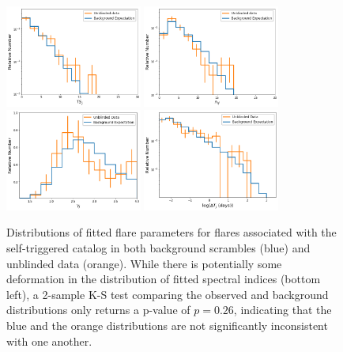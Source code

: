 \begin{figure}[h]
\centering
\includegraphics[width=0.4\textwidth]{figs/st_tsjdist.png}
\includegraphics[width=0.4\textwidth]{figs/st_nsdist.png}
\includegraphics[width=0.4\textwidth]{figs/st_gammadist.png}
\includegraphics[width=0.4\textwidth]{figs/st_dtdist.png}
\caption{Distributions of fitted flare parameters for flares associated with the self-triggered catalog in both background scrambles (blue) and unblinded data (orange). While there is potentially some deformation in the distribution of fitted spectral indices (bottom left), a 2-sample K-S test comparing the observed and background distributions only returns a p-value of $p=0.26$, indicating that the blue and the orange distributions are not significantly inconsistent with one another. }
\label{fig:sthists}
\end{figure}

